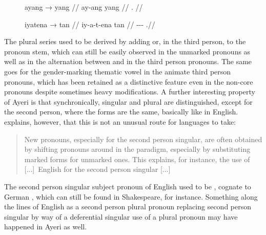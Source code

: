 \begin{figure}[h]
\pex\label{ex:prongen}
\a\begingl
	\gla ayang → yang //
	\glb ay-ang {} yang //
	\glc \makebox[\widthof{\Tsg{}-\M{}-\Pl{}-\Gen{}}][l]{\Fsg{}-\Aarg{}} {} 
		\Fsg{}.\Aarg{} //
\endgl

\a\begingl
	\gla iyatena → tan //
	\glb iy-a-t-ena {} tan //
	\glc \Tsg{}-\M{}-\Pl{}-\Gen{} {} \TsgM{}.\Gen{}\footnotemark //
\endgl
\xe
\end{figure}


The plural series used to be derived by adding  or, in the third 
person,  to the pronoun stem, which can still be easily 
observed in the unmarked pronouns as well as in the alternation between 
 and  in the third person pronouns. The same goes 
for the gender-marking thematic vowel in the animate third person pronouns, 
which has been retained as a distinctive feature even in the non-core pronouns 
despite sometimes heavy modifications. A further interesting property of Ayeri 
is that synchronically, singular and plural are distinguished, except for the 
second person, where the forms are the same, basically like in English. 
\citet{lehmann2015} explains, however, that this is not an unusual route for 
languages to take:

\blockcquote[42]{lehmann2015}{New pronouns, especially for the second person 
singular, are often obtained by shifting pronouns around in the paradigm,
especially by substituting marked forms for unmarked ones. This explains, for
instance, the use of [...]\ English  for the second person singular
[...]}

The second person singular subject pronoun of English used to be , 
cognate to German , which can still be found in Shakespeare, for 
instance. Something along the lines of English  as a second 
person plural pronoun replacing second person singular  by way of a 
deferential singular use of a plural pronoun \citep[you, pron., adj., and 
n.]{oed} may have happened in Ayeri as well.

